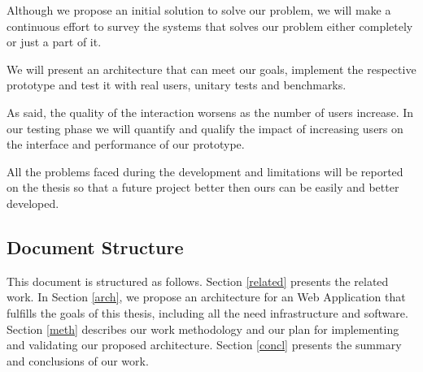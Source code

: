 
Although we propose an initial solution to solve our problem, we will make a continuous effort to survey the systems that solves our problem either completely or just a part of it.

We will present an architecture that can meet our goals, implement the respective prototype and test it with real users, unitary tests and benchmarks.

As \cite{geddes} said, the quality of the interaction worsens as the number of users increase. In our testing phase we will quantify and qualify the impact of increasing users on the interface and performance of our prototype. 

	All the problems faced during the development and limitations will be reported on the thesis so that a future project better then ours can be easily and better developed.

\subsection{Document Structure} %
This document is structured as follows. Section \ref{related} presents the related work.
	In Section \ref{arch}, we propose an architecture for an Web Application that fulfills the goals of this thesis, including all the need infrastructure and software.
	Section \ref{meth} describes our work methodology and our plan for implementing and validating our proposed architecture.
	Section \ref{concl} presents the summary and conclusions of our work.

